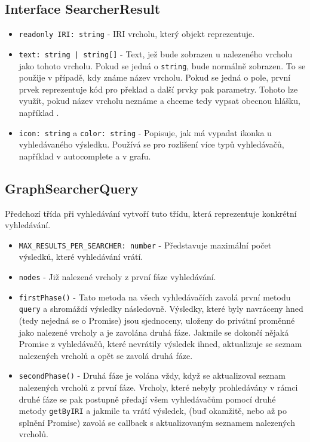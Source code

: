 \subsection{Interface SearcherResult}
\begin{itemize}
  \item \texttt{readonly IRI: string} - IRI vrcholu, který objekt reprezentuje.
  \item \texttt{text: string | string[]} - Text, jež bude zobrazen u nalezeného vrcholu jako  tohoto vrcholu. Pokud se jedná o \texttt{string}, bude normálně zobrazen. To se použije v případě, kdy známe název vrcholu. Pokud se jedná o pole, první prvek reprezentuje kód pro překlad a další prvky pak parametry. Tohoto lze využít, pokud název vrcholu neznáme a chceme tedy vypsat obecnou hlášku, například .
  \item \texttt{icon: string} a \texttt{color: string} - Popisuje, jak má vypadat ikonka u vyhledávaného výsledku. Používá se pro rozlišení více typů vyhledávačů, například v autocomplete a v grafu.
\end{itemize}

\subsection{GraphSearcherQuery}
Předchozí třída při vyhledávání vytvoří tuto třídu, která reprezentuje konkrétní vyhledávání.
\begin{itemize}
  \item \texttt{MAX_RESULTS_PER_SEARCHER: number} - Představuje maximální počet výsledků, které vyhledávání vrátí.
  \item \texttt{nodes} - Již nalezené vrcholy z první fáze vyhledávání.
\end{itemize}

\begin{itemize}
  \item \texttt{firstPhase()} - Tato metoda na všech vyhledávačích zavolá první metodu \texttt{query} a shromáždí výsledky následovně. Výsledky, které byly navráceny hned (tedy nejedná se o Promise) jsou sjednoceny, uloženy do privátní proměnné jako nalezené vrcholy a je zavolána druhá fáze. Jakmile se dokončí nějaká Promise z vyhledávačů, které nevrátily výsledek ihned, aktualizuje se seznam nalezených vrcholů a opět se zavolá druhá fáze.
  \item \texttt{secondPhase()} - Druhá fáze je volána vždy, když se aktualizoval seznam nalezených vrcholů z první fáze. Vrcholy, které nebyly prohledávány v rámci druhé fáze se pak postupně předají všem vyhledávačům pomocí druhé metody \texttt{getByIRI} a jakmile ta vrátí výsledek, (buď okamžitě, nebo až po splnění Promise) zavolá se callback s aktualizovaným seznamem nalezených vrcholů.
\end{itemize}


